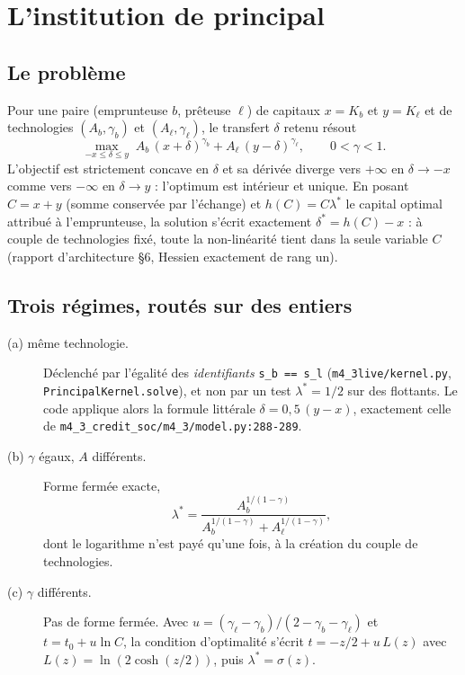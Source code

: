 \documentclass[11pt,a4paper]{article}
\newcommand{\code}[1]{\texttt{#1}}
\begin{document}
\section{L'institution de principal}

\subsection{Le problème}

Pour une paire (emprunteuse $b$, prêteuse $\ell$) de capitaux $x=K_b$ et
$y=K_\ell$ et de technologies $(A_b,\gamma_b)$ et $(A_\ell,\gamma_\ell)$,
le transfert $\delta$ retenu résout
\begin{equation}
\max_{-x\le\delta\le y}\; A_b\,(x+\delta)^{\gamma_b} + A_\ell\,(y-\delta)^{\gamma_\ell},
\qquad 0<\gamma<1 .
\label{eq:probleme}
\end{equation}
L'objectif est strictement concave en $\delta$ et sa dérivée diverge vers
$+\infty$ en $\delta\to-x$ comme vers $-\infty$ en $\delta\to y$ :
l'optimum est intérieur et unique. En posant $C=x+y$ (somme conservée par
l'échange) et $h(C)=C\lambda^{*}$ le capital optimal attribué à
l'emprunteuse, la solution s'écrit exactement $\delta^{*}=h(C)-x$ : à
couple de technologies fixé, toute la non-linéarité tient dans la seule
variable $C$ (rapport d'architecture §6, Hessien exactement de rang un).

\subsection{Trois régimes, routés sur des entiers}

\begin{description}
\item[(a) même technologie.] Déclenché par l'égalité des
  \emph{identifiants} \code{s\_b == s\_l} (\code{m4\_3live/kernel.py},
  \code{PrincipalKernel.solve}), et non par un test $\lambda^{*}=1/2$ sur
  des flottants. Le code applique alors la formule littérale
  $\delta=0{,}5\,(y-x)$, exactement celle de
  \code{m4\_3\_credit\_soc/m4\_3/model.py:288-289}.
\item[(b) $\gamma$ égaux, $A$ différents.] Forme fermée exacte,
  \[\lambda^{*}=\frac{A_b^{1/(1-\gamma)}}{A_b^{1/(1-\gamma)}+A_\ell^{1/(1-\gamma)}},\]
  dont le logarithme n'est payé qu'une fois, à la création du couple de
  technologies.
\item[(c) $\gamma$ différents.] Pas de forme fermée. Avec
  $u=(\gamma_\ell-\gamma_b)/(2-\gamma_b-\gamma_\ell)$ et
  $t=t_0+u\ln C$, la condition d'optimalité s'écrit
  $t=-z/2+u\,L(z)$ avec $L(z)=\ln(2\cosh(z/2))$, puis
  $\lambda^{*}=\sigma(z)$.
\end{description}
\end{document}
